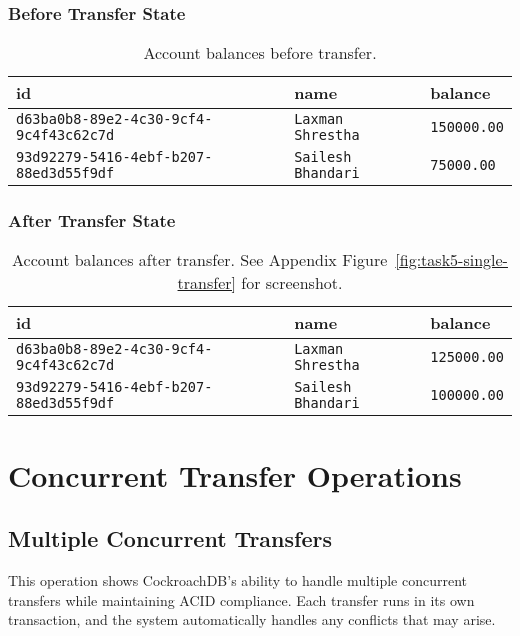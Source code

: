 \subsubsection{Before Transfer State}
\begin{table}[H]
  \centering
  \begin{tabular}{|l|l|l|}
    \hline
    \textbf{id} & \textbf{name} & \textbf{balance} \\
    \hline
    \texttt{d63ba0b8-89e2-4c30-9cf4-9c4f43c62c7d} & \texttt{Laxman Shrestha} & \texttt{150000.00} \\
    \texttt{93d92279-5416-4ebf-b207-88ed3d55f9df} & \texttt{Sailesh Bhandari} & \texttt{75000.00} \\
    \hline
  \end{tabular}
  \caption{Account balances before transfer.}
\end{table}

\subsubsection{After Transfer State}
\begin{table}[H]
  \centering
  \begin{tabular}{|l|l|l|}
    \hline
    \textbf{id} & \textbf{name} & \textbf{balance} \\
    \hline
    \texttt{d63ba0b8-89e2-4c30-9cf4-9c4f43c62c7d} & \texttt{Laxman Shrestha} & \texttt{125000.00} \\
    \texttt{93d92279-5416-4ebf-b207-88ed3d55f9df} & \texttt{Sailesh Bhandari} & \texttt{100000.00} \\
    \hline
  \end{tabular}
  \caption{Account balances after transfer. See Appendix Figure~\ref{fig:task5-single-transfer} for screenshot.}
\end{table}

\section{Concurrent Transfer Operations}

\subsection{Multiple Concurrent Transfers}
This operation shows CockroachDB's ability to handle multiple concurrent transfers while maintaining ACID compliance. Each transfer runs in its own transaction, and the system automatically handles any conflicts that may arise.

